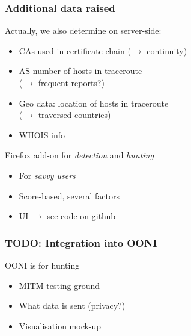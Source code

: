\begin{frame}
\frametitle{Additional data raised}
\begin{block}{Actually, we also determine on server-side:}
  \begin{itemize}
    \item CAs used in certificate chain ($\rightarrow$ continuity)
    \item AS number of hosts in traceroute \\ ($\rightarrow$ frequent reports?)
    \item Geo data: location of hosts in traceroute \\ ($\rightarrow$ traversed countries)
    \item WHOIS info
  \end{itemize}
\end{block}
\begin{block}{Firefox add-on for \textit{detection} and \textit{hunting}}
  \begin{itemize}
    \item For \textit{savvy users}
    \item Score-based, several factors
    \item UI $\rightarrow$ see code on github
  \end{itemize}
\end{block}
\end{frame}


\begin{frame}
\frametitle{TODO: Integration into OONI}
\begin{block}{OONI is for hunting}
  \begin{itemize}
    \item MITM testing ground
    \item What data is sent (privacy?)
    \item Visualisation mock-up
  \end{itemize}
\end{block}
\end{frame}

